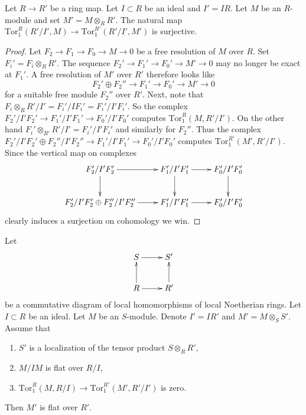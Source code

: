 \begin{lemma}
\label{lemma-surjective-on-tor-one-trivial}
Let $R \to R'$ be a ring map. Let $I \subset R$ be
an ideal and $I' = IR$. Let $M$ be an $R$-module
and set $M' = M \otimes_R R'$. The natural map
$\text{Tor}_1^R(R'/I', M) \to \text{Tor}_1^{R'}(R'/I', M')$
is surjective.
\end{lemma}

\begin{proof}
Let $F_2 \to F_1 \to F_0 \to M \to 0$ be a free resolution of
$M$ over $R$. Set $F_i' = F_i \otimes_R R'$. The sequence
$F_2' \to F_1' \to F_0' \to M' \to 0$ may no longer be exact
at $F_1'$. A free resolution of $M'$ over $R'$ therefore looks
like
$$
F_2' \oplus F_2'' \to F_1' \to F_0' \to M' \to 0
$$
for a suitable free module $F_2''$ over $R'$. Next, note that
$F_i \otimes_R R'/I' = F_i' / IF_i' = F_i'/I'F_i'$.
So the complex $F_2'/I'F_2' \to F_1'/I'F_1' \to F_0'/I'F_0'$
computes $\text{Tor}_1^R(M, R'/I')$. On the other hand
$F_i' \otimes_{R'} R'/I' = F_i'/I'F_i'$ and similarly
for $F_2''$. Thus the complex
$F_2'/I'F_2' \oplus F_2''/I'F_2'' \to F_1'/I'F_1' \to F_0'/I'F_0'$
computes $\text{Tor}_1^{R'}(M', R'/I')$. Since the vertical
map on complexes
$$
\xymatrix{
F_2'/I'F_2' \ar[r] \ar[d] &
F_1'/I'F_1' \ar[r] \ar[d] &
F_0'/I'F_0' \ar[d] \\
F_2'/I'F_2' \oplus F_2''/I'F_2'' \ar[r] &
F_1'/I'F_1' \ar[r] &
F_0'/I'F_0'
}
$$
clearly induces a surjection on cohomology we win.
\end{proof}

\begin{lemma}
\label{lemma-another-variant-local-criterion-flatness}
Let
$$
\xymatrix{
S \ar[r] & S' \\
R \ar[r] \ar[u] & R' \ar[u]
}
$$
be a commutative diagram of local homomorphisms of local Noetherian rings.
Let $I \subset R$ be an ideal.
Let $M$ be an $S$-module.
Denote $I' = IR'$ and $M' = M\otimes_S S'$.
Assume that
\begin{enumerate}
\item $S'$ is a localization of the tensor product
$S \otimes_R R'$,
\item $M/IM$ is flat over $R/I$,
\item $\text{Tor}_1^R(M, R/I) \to \text{Tor}_1^{R'}(M', R'/I')$
is zero.
\end{enumerate}
Then $M'$ is flat over $R'$.
\end{lemma}

